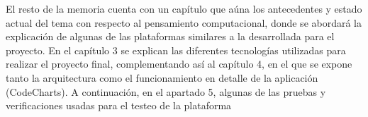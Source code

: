 El resto de la memoria cuenta con un capítulo que aúna los antecedentes y estado actual del tema con respecto al pensamiento computacional, donde se abordará la explicación de algunas de las plataformas similares a la desarrollada para el proyecto. En el capítulo 3 se explican las diferentes tecnologías utilizadas para realizar el proyecto final, complementando así
al capítulo 4, en el que se expone tanto la arquitectura como el funcionamiento en detalle de la aplicación (CodeCharts). A continuación, en el apartado 5, algunas de las pruebas y verificaciones usadas para el testeo de la plataforma



